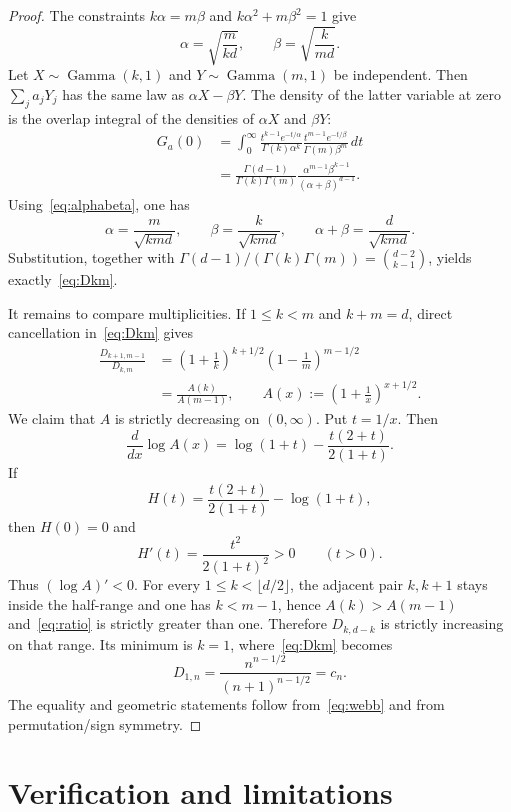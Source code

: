 \documentclass[11pt]{article}
\begin{document}
\begin{proof}
The constraints $k\alpha=m\beta$ and
$k\alpha^2+m\beta^2=1$ give
\begin{equation}\label{eq:alphabeta}
 \alpha=\sqrt{\frac{m}{kd}},\qquad
 \beta =\sqrt{\frac{k}{md}}.
\end{equation}
Let $X\sim\operatorname{Gamma}(k,1)$ and
$Y\sim\operatorname{Gamma}(m,1)$ be independent.  Then
$\sum_j a_jY_j$ has the same law as $\alpha X-\beta Y$.  The density of the
latter variable at zero is the overlap integral of the densities of
$\alpha X$ and $\beta Y$:
\begin{align*}
 G_a(0)
 &=\int_0^\infty
 \frac{t^{k-1}e^{-t/\alpha}}{\Gamma(k)\alpha^k}
 \frac{t^{m-1}e^{-t/\beta}}{\Gamma(m)\beta^m}\,dt\\
 &=\frac{\Gamma(d-1)}{\Gamma(k)\Gamma(m)}
 \frac{\alpha^{m-1}\beta^{k-1}}{(\alpha+\beta)^{d-1}}.
\end{align*}
Using~\eqref{eq:alphabeta}, one has
\[
 \alpha=\frac{m}{\sqrt{kmd}},\qquad
 \beta=\frac{k}{\sqrt{kmd}},\qquad
 \alpha+\beta=\frac d{\sqrt{kmd}}.
\]
Substitution, together with
$\Gamma(d-1)/(\Gamma(k)\Gamma(m))=\binom{d-2}{k-1}$, yields
exactly~\eqref{eq:Dkm}.

It remains to compare multiplicities.  If $1\leq k<m$ and $k+m=d$, direct
cancellation in~\eqref{eq:Dkm} gives
\begin{align}\label{eq:ratio}
 \frac{D_{k+1,m-1}}{D_{k,m}}
 &=\left(1+\frac1k\right)^{k+1/2}
   \left(1-\frac1m\right)^{m-1/2}\\
 &=\frac{A(k)}{A(m-1)},
 \qquad
 A(x):=\left(1+\frac1x\right)^{x+1/2}.
\end{align}
We claim that $A$ is strictly decreasing on $(0,\infty)$.  Put $t=1/x$.
Then
\[
 \frac{d}{dx}\log A(x)
 =\log(1+t)-\frac{t(2+t)}{2(1+t)}.
\]
If
\[
 H(t)=\frac{t(2+t)}{2(1+t)}-\log(1+t),
\]
then $H(0)=0$ and
\[
 H'(t)=\frac{t^2}{2(1+t)^2}>0\qquad(t>0).
\]
Thus $(\log A)'<0$.  For every $1\leq k<\lfloor d/2\rfloor$, the adjacent
pair $k,k+1$ stays inside the half-range and one has $k<m-1$, hence
$A(k)>A(m-1)$ and~\eqref{eq:ratio} is strictly greater than one.  Therefore
$D_{k,d-k}$ is strictly increasing on that range.  Its minimum is $k=1$,
where~\eqref{eq:Dkm} becomes
\[
 D_{1,n}=\frac{n^{n-1/2}}{(n+1)^{n-1/2}}=c_n.
\]
The equality and geometric statements follow from~\eqref{eq:webb} and from
permutation/sign symmetry.
\end{proof}

\section{Verification and limitations}
\end{document}
